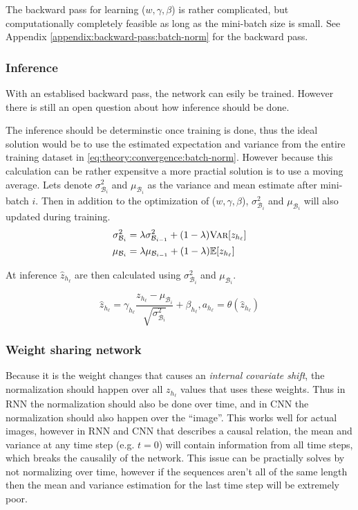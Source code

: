 The backward pass for learning ($w, \gamma, \beta$) is rather complicated, but computationally completely feasible as long as the mini-batch size is small. See Appendix \ref{appendix:backward-pass:batch-norm} for the backward pass.

\subsubsection{Inference}

With an establised backward pass, the network can esily be trained. However there is still an open question about how inference should be done.

The inference should be determinstic once training is done, thus the ideal solution would be to use the estimated expectation and variance from the entire training dataset in \eqref{eq:theory:convergence:batch-norm}. However because this calculation can be rather expensitve a more practial solution is to use a moving average. Lets denote $\sigma^2_{\mathcal{B}_i}$ and $\mu_{\mathcal{B}_i}$ as the variance and mean estimate after mini-batch $i$. Then in addition to the optimization of ($w, \gamma, \beta$), $\sigma^2_{\mathcal{B}_i}$ and $\mu_{\mathcal{B}_i}$ will also updated during training.
\begin{equation}
\begin{aligned}
\sigma^2_{\mathcal{B}_i} &= \lambda \sigma^2_{\mathcal{B}_{i-1}} + (1 - \lambda) \textsc{Var}[z_{h_\ell}] \\
\mu_{\mathcal{B}_i} &= \lambda \mu_{\mathcal{B}_{i-1}} + (1 - \lambda) \mathbb{E}[z_{h_\ell}]
\end{aligned}
\end{equation}

At inference $\hat{z}_{h_\ell}$ are then calculated using $\sigma^2_{\mathcal{B}_i}$ and $\mu_{\mathcal{B}_i}$.

\begin{equation}
\hat{z}_{h_\ell} = \gamma_{h_\ell} \frac{z_{h_\ell} - \mu_{\mathcal{B}_i}}{\sqrt{\sigma^2_{\mathcal{B}_i}}} + \beta_{h_\ell}, a_{h_\ell} = \theta(\hat{z}_{h_\ell})
\end{equation}

\subsubsection{Weight sharing network}

Because it is the weight changes that causes an \textit{internal covariate shift}, the normalization should happen over all $z_{h_\ell}$ values that uses these weights. Thus in RNN the normalization should also be done over time, and in CNN the normalization should also happen over the ``image''. This works well for actual images, however in RNN and CNN that describes a causal relation, the mean and variance at any time step (e.g. $t=0$) will contain information from all time steps, which breaks the causalily of the network. This issue can be practially solves by not normalizing over time, however if the sequences aren't all of the same length then the mean and variance estimation for the last time step will be extremely poor.

